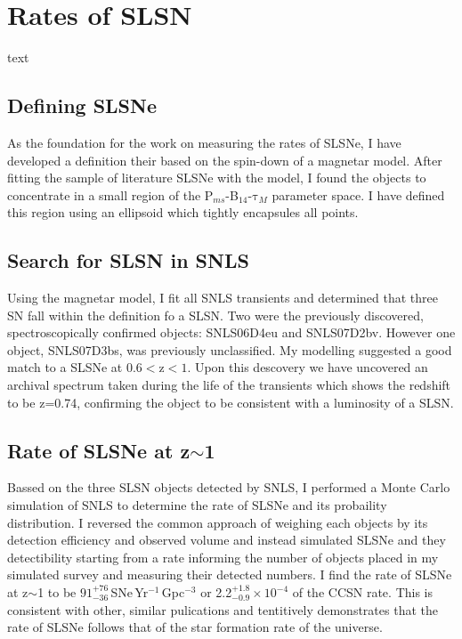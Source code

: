 \section{Rates of SLSN}
text

\subsection{Defining SLSNe}
As the foundation for the work on measuring the rates of SLSNe, I have developed a definition their based on the spin-down of a magnetar model. After fitting the sample of literature SLSNe with the model, I found the objects to concentrate in a small region of the P$_{ms}$-B$_{14}$-$\mathrm{\tau}_M$ parameter space. I have defined this region using an ellipsoid which tightly encapsules all points.

\subsection{Search for SLSN in SNLS}
Using the magnetar model, I fit all SNLS transients and determined that three SN fall within the definition fo a SLSN. Two were the previously discovered, spectroscopically confirmed objects: SNLS06D4eu and SNLS07D2bv. However one object, SNLS07D3bs, was previously unclassified. My modelling suggested a good match to a SLSNe at 0.6$<$z$<1$. Upon this descovery we have uncovered an archival spectrum taken during the life of the transients which shows the redshift to be z=0.74, confirming the object to be consistent with a luminosity of a SLSN.

\subsection{Rate of SLSNe at z$\sim$1}
Bassed on the three SLSN objects detected by SNLS, I performed a Monte Carlo simulation of SNLS to determine the rate of SLSNe and its probaility distribution. I reversed the common approach of weighing each objects by its detection efficiency and observed volume and instead simulated SLSNe and they detectibility starting from a rate informing the number of objects placed in my simulated survey and measuring their detected numbers. I find the rate of SLSNe at z$\sim$1 to be $91^{+76}_{-36}$\,SNe\,Yr$^{-1}$\,Gpc$^{-3}$ or 2.2$^{+1.8}_{-0.9}\times10^{-4}$ of the CCSN rate. This is consistent with other, similar pulications and tentitively demonstrates that the rate of SLSNe follows that of the star formation rate of the universe.

